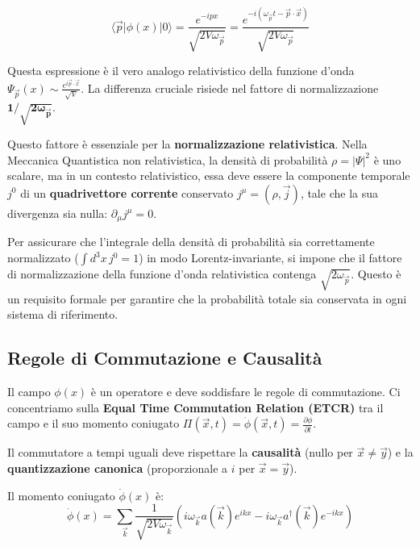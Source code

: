 \begin{equation}
\langle \vec{p} | \phi(x) | 0 \rangle = \frac{e^{-ipx}}{\sqrt{2V\omega_{\vec{p}}}} = \frac{e^{-i(\omega_{\vec{p}} t - \vec{p} \cdot \vec{x})}}{\sqrt{2V\omega_{\vec{p}}}}
\end{equation}

Questa espressione è il vero analogo relativistico della funzione d'onda $\Psi_{\vec{p}}(x) \sim \frac{e^{i\vec{p}\cdot\vec{x}}}{\sqrt{V}}$. La differenza cruciale risiede nel fattore di normalizzazione $\mathbf{1/\sqrt{2\omega_{\vec{p}}}}$.

Questo fattore è essenziale per la \textbf{normalizzazione relativistica}. Nella Meccanica Quantistica non relativistica, la densità di probabilità $\rho = |\Psi|^2$ è uno scalare, ma in un contesto relativistico, essa deve essere la componente temporale $j^0$ di un \textbf{quadrivettore corrente} conservato $j^\mu = (\rho, \vec{j})$, tale che la sua divergenza sia nulla: $\partial_\mu j^\mu = 0$.

Per assicurare che l'integrale della densità di probabilità sia correttamente normalizzato ($\int d^3x \, j^0 = 1$) in modo Lorentz-invariante, si impone che il fattore di normalizzazione della funzione d'onda relativistica contenga $\sqrt{2\omega_{\vec{p}}}$. Questo è un requisito formale per garantire che la probabilità totale sia conservata in ogni sistema di riferimento.

\subsection{Regole di Commutazione e Causalità}

Il campo $\phi(x)$ è un operatore e deve soddisfare le regole di commutazione. Ci concentriamo sulla \textbf{Equal Time Commutation Relation (ETCR)} tra il campo e il suo momento coniugato $\Pi(\vec{x},t) = \dot{\phi}(\vec{x},t) = \frac{\partial\phi}{\partial t}$.

Il commutatore a tempi uguali deve rispettare la \textbf{causalità} (nullo per $\vec{x} \neq \vec{y}$) e la \textbf{quantizzazione canonica} (proporzionale a $i$ per $\vec{x} = \vec{y}$).

Il momento coniugato $\dot{\phi}(x)$ è:
\begin{equation}
\dot{\phi}(x) = \sum_{\vec{k}} \frac{1}{\sqrt{2V\omega_{\vec{k}}}} \left( i\omega_{\vec{k}} a(\vec{k})e^{ikx} - i\omega_{\vec{k}} a^{\dagger}(\vec{k})e^{-ikx} \right)
\end{equation}

